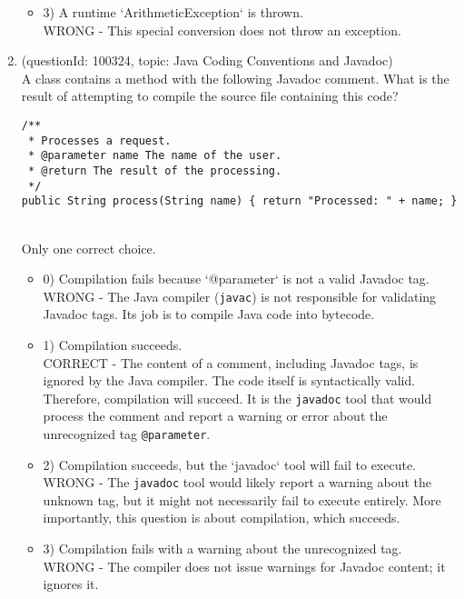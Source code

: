 \documentclass[12pt]{article}
\begin{document}
\begin{enumerate}[label=(\arabic*)]
\begin{itemize}
\item 3) A runtime `ArithmeticException` is thrown.
 \\ 
WRONG - This special conversion does not throw an exception.

\end{itemize}
\item (questionId: 100324, topic: Java Coding Conventions and Javadoc) \\ 
A class contains a method with the following Javadoc comment. What is the result of attempting to compile the source file containing this code?
\begin{verbatim}
/**
 * Processes a request.
 * @parameter name The name of the user.
 * @return The result of the processing.
 */
public String process(String name) { return "Processed: " + name; }
\end{verbatim}
\\ \noindent Only one correct choice. 
\begin{itemize}
\item 0) Compilation fails because `@parameter` is not a valid Javadoc tag.
 \\ 
WRONG - The Java compiler (\verb|javac|) is not responsible for validating Javadoc tags. Its job is to compile Java code into bytecode.

\item 1) Compilation succeeds.
 \\ 
CORRECT - The content of a comment, including Javadoc tags, is ignored by the Java compiler. The code itself is syntactically valid. Therefore, compilation will succeed. It is the \verb|javadoc| tool that would process the comment and report a warning or error about the unrecognized tag \verb|@parameter|.

\item 2) Compilation succeeds, but the `javadoc` tool will fail to execute.
 \\ 
WRONG - The \verb|javadoc| tool would likely report a warning about the unknown tag, but it might not necessarily fail to execute entirely. More importantly, this question is about compilation, which succeeds.

\item 3) Compilation fails with a warning about the unrecognized tag.
 \\ 
WRONG - The compiler does not issue warnings for Javadoc content; it ignores it.


\end{itemize}
\end{enumerate}
\end{document}
